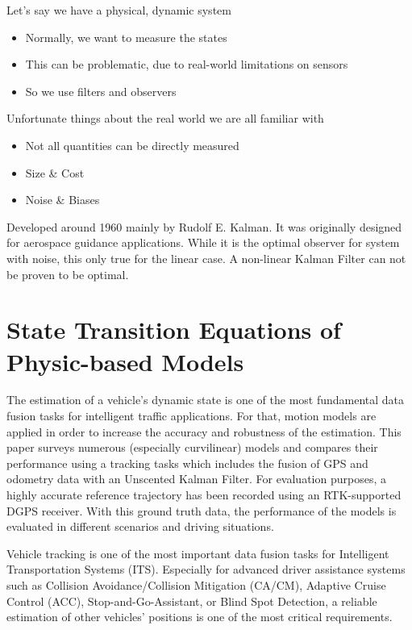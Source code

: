 Let's say we have a physical, dynamic system
\begin{itemize}
	\item Normally, we want to measure the states
	\item This can be problematic, due to real-world limitations on sensors
	\item So we use filters and observers
\end{itemize}

Unfortunate things about the real world we are all familiar with
\begin{itemize}
	\item Not all quantities can be directly measured
	\item Size \& Cost
	\item Noise \& Biases
\end{itemize}


	Developed around 1960 mainly by Rudolf E. Kalman.  It was originally designed for aerospace guidance applications.  
	While it is the optimal observer for system with noise, this only true for the linear case.  
	A non-linear Kalman Filter can not be proven to be optimal.
	


\section{State Transition Equations of Physic-based Models}

The estimation of a vehicle's dynamic state is one of the most fundamental data fusion tasks for intelligent traffic applications. For that, motion models are applied in order to increase the accuracy and robustness of the estimation. This paper surveys numerous (especially curvilinear) models and compares their performance using a tracking tasks which includes the fusion of GPS and odometry data with an Unscented Kalman Filter. For evaluation purposes, a highly accurate reference trajectory has been recorded using an RTK-supported DGPS receiver. With this ground truth data, the performance of the models is evaluated in different scenarios and driving situations.

Vehicle tracking is one of the most important data fusion tasks for Intelligent Transportation Systems (ITS). Especially for advanced driver assistance systems such as Collision Avoidance/Collision Mitigation (CA/CM), Adaptive Cruise Control (ACC), Stop-and-Go-Assistant, or Blind Spot Detection, a reliable estimation of other vehicles' positions is one of the most critical requirements.

